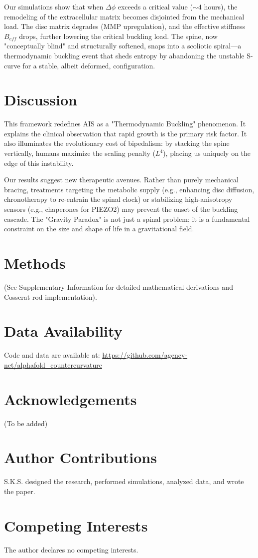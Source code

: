 \documentclass[12pt]{article}
\begin{document}
Our simulations show that when $\Delta \phi$ exceeds a critical value ($\sim 4$ hours), the remodeling of the extracellular matrix becomes disjointed from the mechanical load. The disc matrix degrades (MMP upregulation), and the effective stiffness $B_{eff}$ drops, further lowering the critical buckling load. The spine, now "conceptually blind" and structurally softened, snaps into a scoliotic spiral---a thermodynamic buckling event that sheds entropy by abandoning the unstable S-curve for a stable, albeit deformed, configuration.

\section*{Discussion}

This framework redefines AIS as a "Thermodynamic Buckling" phenomenon. It explains the clinical observation that rapid growth is the primary risk factor. It also illuminates the evolutionary cost of bipedalism: by stacking the spine vertically, humans maximize the scaling penalty ($L^4$), placing us uniquely on the edge of this instability.

Our results suggest new therapeutic avenues. Rather than purely mechanical bracing, treatments targeting the metabolic supply (e.g., enhancing disc diffusion, chronotherapy to re-entrain the spinal clock) or stabilizing high-anisotropy sensors (e.g., chaperones for PIEZO2) may prevent the onset of the buckling cascade. The "Gravity Paradox" is not just a spinal problem; it is a fundamental constraint on the size and shape of life in a gravitational field.

\section*{Methods}
(See Supplementary Information for detailed mathematical derivations and Cosserat rod implementation).




\section*{Data Availability}
Code and data are available at: \url{https://github.com/agency-net/alphafold_countercurvature}

\section*{Acknowledgements}
(To be added)

\section*{Author Contributions}
S.K.S. designed the research, performed simulations, analyzed data, and wrote the paper.

\section*{Competing Interests}
The author declares no competing interests.
\end{document}
